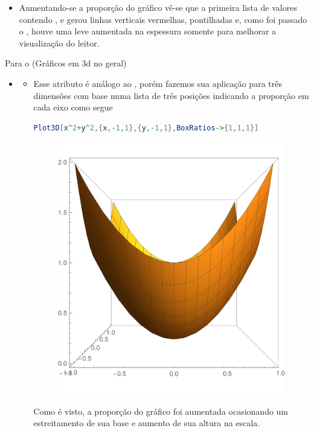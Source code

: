 \documentclass[a4paper, 12pt]{article}
\begin{document}
\begin{itemize}
	\begin{itemize}
		\item[] Aumentando-se a proporção do gráfico vê-se que a primeira lista de valores contendo ,  e  gerou linhas verticais vermelhas, pontilhadas e, como foi passado o , houve uma leve aumentada na espessura somente para melhorar a visualização do leitor.
	\end{itemize}

	\end{itemize}

	\newpage
	\vspace{.5cm}
	Para o  (Gráficos em 3d no geral) 
	\begin{itemize}
		\item{}
		\begin{itemize}
			\item Esse atributo é análogo ao , porém fazemos sua aplicação para três dimensões com base numa lista de três posições indicando a proporção em cada eixo como segue
			
\begin{lstlisting}[language=Mathematica]
Plot3D[x^2+y^2,{x,-1,1},{y,-1,1},BoxRatios->{1,1,1}]
\end{lstlisting}
			\begin{figure}[!h]
				\centering
				\includegraphics[scale=.35]{images/boxRatios}
			\end{figure}
			Como é visto, a proporção do gráfico foi aumentada ocasionando um estreitamento de sua base e aumento de sua altura na escala. 
			

\end{itemize}
\end{itemize}
\end{document}
